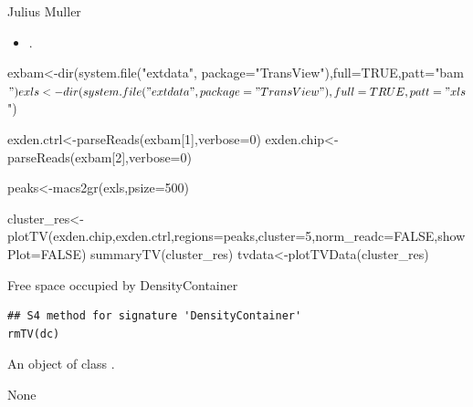 \documentclass[letterpaper]{book}
\begin{document}
%
\begin{Author}
Julius Muller 
\end{Author}
%
\begin{SeeAlso}
\begin{itemize}

\item{} .

\end{itemize}

\end{SeeAlso}
%
\begin{Examples}
\begin{ExampleCode}

exbam<-dir(system.file("extdata", package="TransView"),full=TRUE,patt="bam$")
exls<-dir(system.file("extdata", package="TransView"),full=TRUE,patt="xls$")

exden.ctrl<-parseReads(exbam[1],verbose=0)
exden.chip<-parseReads(exbam[2],verbose=0)

peaks<-macs2gr(exls,psize=500)

cluster_res<-plotTV(exden.chip,exden.ctrl,regions=peaks,cluster=5,norm_readc=FALSE,showPlot=FALSE)
summaryTV(cluster_res)
tvdata<-plotTVData(cluster_res)


\end{ExampleCode}
\end{Examples}
%
\begin{Description}
Free space occupied by DensityContainer
\end{Description}
%
\begin{Usage}
\begin{verbatim}
## S4 method for signature 'DensityContainer'
rmTV(dc)
\end{verbatim}
\end{Usage}
%
\begin{Arguments}
\begin{ldescription}
\item[\code{dc}] 
An object of class .

\end{ldescription}
\end{Arguments}
%
\begin{Value}
None
\end{Value}
\end{document}
